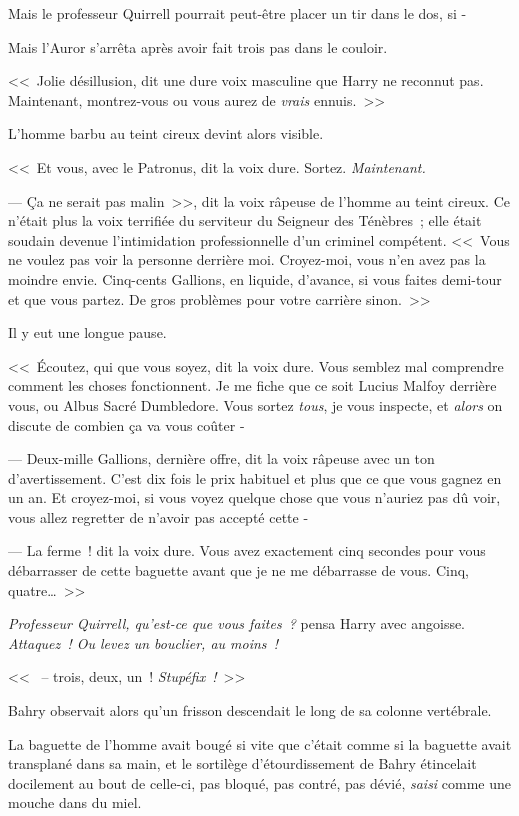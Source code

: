 Mais le professeur Quirrell pourrait peut-être placer un tir dans le dos, si -

Mais l'Auror s'arrêta après avoir fait trois pas dans le couloir.

<<~Jolie désillusion, dit une dure voix masculine que Harry ne reconnut pas. Maintenant, montrez-vous ou vous aurez de \emph{vrais} ennuis.~>>

L'homme barbu au teint cireux devint alors visible.

<<~Et vous, avec le Patronus, dit la voix dure. Sortez. \emph{Maintenant.}

--- Ça ne serait pas malin~>>, dit la voix râpeuse de l'homme au teint cireux. Ce n'était plus la voix terrifiée du serviteur du Seigneur des Ténèbres~; elle était soudain devenue l'intimidation professionnelle d'un criminel compétent. <<~Vous ne voulez pas voir la personne derrière moi. Croyez-moi, vous n'en avez pas la moindre envie. Cinq-cents Gallions, en liquide, d'avance, si vous faites demi-tour et que vous partez. De gros problèmes pour votre carrière sinon.~>>

Il y eut une longue pause.

<<~Écoutez, qui que vous soyez, dit la voix dure. Vous semblez mal comprendre comment les choses fonctionnent. Je me fiche que ce soit Lucius Malfoy derrière vous, ou Albus Sacré Dumbledore. Vous sortez \emph{tous}, je vous inspecte, et \emph{alors} on discute de combien ça va vous coûter -

--- Deux-mille Gallions, dernière offre, dit la voix râpeuse avec un ton d'avertissement. C'est dix fois le prix habituel et plus que ce que vous gagnez en un an. Et croyez-moi, si vous voyez quelque chose que vous n'auriez pas dû voir, vous allez regretter de n'avoir pas accepté cette -

--- La ferme~! dit la voix dure. Vous avez exactement cinq secondes pour vous débarrasser de cette baguette avant que je ne me débarrasse de vous. Cinq, quatre…~>>

\emph{Professeur Quirrell, qu'est-ce que vous faites~?} pensa Harry avec angoisse. \emph{Attaquez~! Ou levez un bouclier, au moins~!}

<<~ -- trois, deux, un~! \emph{Stupéfix~!}~>>

\later

Bahry observait alors qu'un frisson descendait le long de sa colonne vertébrale.

La baguette de l'homme avait bougé si vite que c'était comme si la baguette avait transplané dans sa main, et le sortilège d'étourdissement de Bahry étincelait docilement au bout de celle-ci, pas bloqué, pas contré, pas dévié, \emph{saisi} comme une mouche dans du miel.

